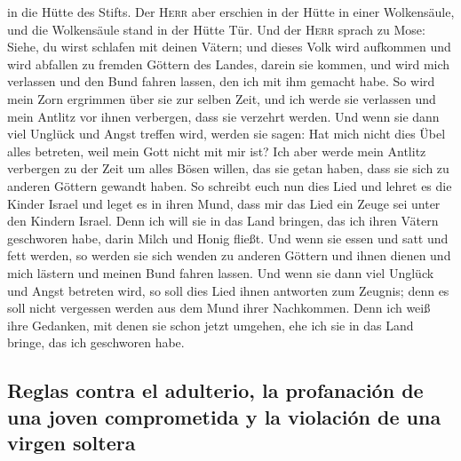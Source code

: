 in die Hütte des Stifts.  Der \textsc{Herr} aber erschien
in der Hütte in einer Wolkensäule, und die Wolkensäule stand in der
Hütte Tür.  Und der \textsc{Herr} sprach zu Mose: Siehe,
du wirst schlafen mit deinen Vätern; und dieses Volk wird aufkommen und
wird abfallen zu fremden Göttern des Landes, darein sie kommen, und wird
mich verlassen und den Bund fahren lassen, den ich mit ihm gemacht habe.
 So wird mein Zorn ergrimmen über sie zur selben Zeit,
und ich werde sie verlassen und mein Antlitz vor ihnen verbergen, dass
sie verzehrt werden. Und wenn sie dann viel Unglück und Angst treffen
wird, werden sie sagen: Hat mich nicht dies Übel alles betreten, weil
mein Gott nicht mit mir ist?  Ich aber werde mein Antlitz
verbergen zu der Zeit um alles Bösen willen, das sie getan haben, dass
sie sich zu anderen Göttern gewandt haben.  So schreibt
euch nun dies Lied und lehret es die Kinder Israel und leget es in ihren
Mund, dass mir das Lied ein Zeuge sei unter den Kindern Israel.
 Denn ich will sie in das Land bringen, das ich ihren
Vätern geschworen habe, darin Milch und Honig fließt. Und wenn sie essen
und satt und fett werden, so werden sie sich wenden zu anderen Göttern
und ihnen dienen und mich lästern und meinen Bund fahren lassen.
 Und wenn sie dann viel Unglück und Angst betreten wird,
so soll dies Lied ihnen antworten zum Zeugnis; denn es soll nicht
vergessen werden aus dem Mund ihrer Nachkommen. Denn ich weiß ihre
Gedanken, mit denen sie schon jetzt umgehen, ehe ich sie in das Land
bringe, das ich geschworen habe.

\hypertarget{reglas-contra-el-adulterio-la-profanaciuxf3n-de-una-joven-comprometida-y-la-violaciuxf3n-de-una-virgen-soltera}{%
\subsection{Reglas contra el adulterio, la profanación de una joven
comprometida y la violación de una virgen
soltera}\label{reglas-contra-el-adulterio-la-profanaciuxf3n-de-una-joven-comprometida-y-la-violaciuxf3n-de-una-virgen-soltera}}

